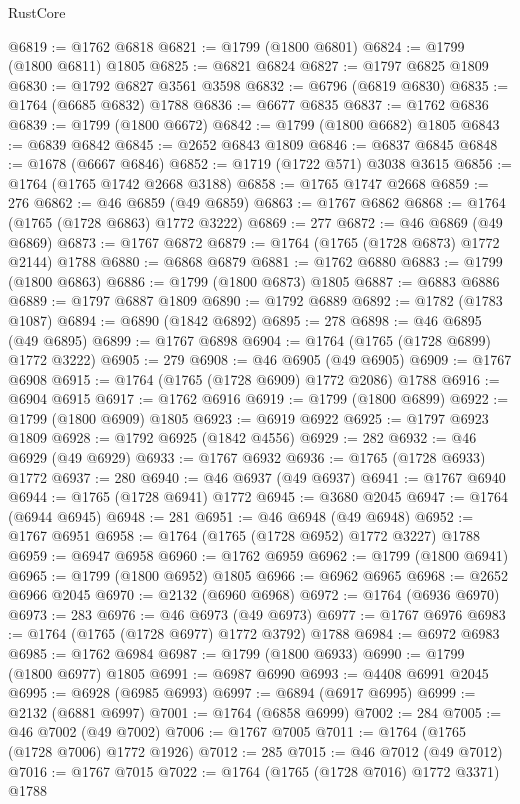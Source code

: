 \begin{lexlean}{RustCore}
\begin{coremodule}
@6819 := @1762 @6818
@6821 := @1799 (@1800 @6801)
@6824 := @1799 (@1800 @6811) @1805
@6825 := @6821 @6824
@6827 := @1797 @6825 @1809
@6830 := @1792 @6827 @3561 @3598
@6832 := @6796 (@6819 @6830)
@6835 := @1764 (@6685 @6832) @1788
@6836 := @6677 @6835
@6837 := @1762 @6836
@6839 := @1799 (@1800 @6672)
@6842 := @1799 (@1800 @6682) @1805
@6843 := @6839 @6842
@6845 := @2652 @6843 @1809
@6846 := @6837 @6845
@6848 := @1678 (@6667 @6846)
@6852 := @1719 (@1722 @571) @3038 @3615
@6856 := @1764 (@1765 @1742 @2668 @3188)
@6858 := @1765 @1747 @2668
@6859 := 276
@6862 := @46 @6859 (@49 @6859)
@6863 := @1767 @6862
@6868 := @1764 (@1765 (@1728 @6863) @1772 @3222)
@6869 := 277
@6872 := @46 @6869 (@49 @6869)
@6873 := @1767 @6872
@6879 := @1764 (@1765 (@1728 @6873) @1772 @2144) @1788
@6880 := @6868 @6879
@6881 := @1762 @6880
@6883 := @1799 (@1800 @6863)
@6886 := @1799 (@1800 @6873) @1805
@6887 := @6883 @6886
@6889 := @1797 @6887 @1809
@6890 := @1792 @6889
@6892 := @1782 (@1783 @1087)
@6894 := @6890 (@1842 @6892)
@6895 := 278
@6898 := @46 @6895 (@49 @6895)
@6899 := @1767 @6898
@6904 := @1764 (@1765 (@1728 @6899) @1772 @3222)
@6905 := 279
@6908 := @46 @6905 (@49 @6905)
@6909 := @1767 @6908
@6915 := @1764 (@1765 (@1728 @6909) @1772 @2086) @1788
@6916 := @6904 @6915
@6917 := @1762 @6916
@6919 := @1799 (@1800 @6899)
@6922 := @1799 (@1800 @6909) @1805
@6923 := @6919 @6922
@6925 := @1797 @6923 @1809
@6928 := @1792 @6925 (@1842 @4556)
@6929 := 282
@6932 := @46 @6929 (@49 @6929)
@6933 := @1767 @6932
@6936 := @1765 (@1728 @6933) @1772
@6937 := 280
@6940 := @46 @6937 (@49 @6937)
@6941 := @1767 @6940
@6944 := @1765 (@1728 @6941) @1772
@6945 := @3680 @2045
@6947 := @1764 (@6944 @6945)
@6948 := 281
@6951 := @46 @6948 (@49 @6948)
@6952 := @1767 @6951
@6958 := @1764 (@1765 (@1728 @6952) @1772 @3227) @1788
@6959 := @6947 @6958
@6960 := @1762 @6959
@6962 := @1799 (@1800 @6941)
@6965 := @1799 (@1800 @6952) @1805
@6966 := @6962 @6965
@6968 := @2652 @6966 @2045
@6970 := @2132 (@6960 @6968)
@6972 := @1764 (@6936 @6970)
@6973 := 283
@6976 := @46 @6973 (@49 @6973)
@6977 := @1767 @6976
@6983 := @1764 (@1765 (@1728 @6977) @1772 @3792) @1788
@6984 := @6972 @6983
@6985 := @1762 @6984
@6987 := @1799 (@1800 @6933)
@6990 := @1799 (@1800 @6977) @1805
@6991 := @6987 @6990
@6993 := @4408 @6991 @2045
@6995 := @6928 (@6985 @6993)
@6997 := @6894 (@6917 @6995)
@6999 := @2132 (@6881 @6997)
@7001 := @1764 (@6858 @6999)
@7002 := 284
@7005 := @46 @7002 (@49 @7002)
@7006 := @1767 @7005
@7011 := @1764 (@1765 (@1728 @7006) @1772 @1926)
@7012 := 285
@7015 := @46 @7012 (@49 @7012)
@7016 := @1767 @7015
@7022 := @1764 (@1765 (@1728 @7016) @1772 @3371) @1788

\end{coremodule}
\end{lexlean}
